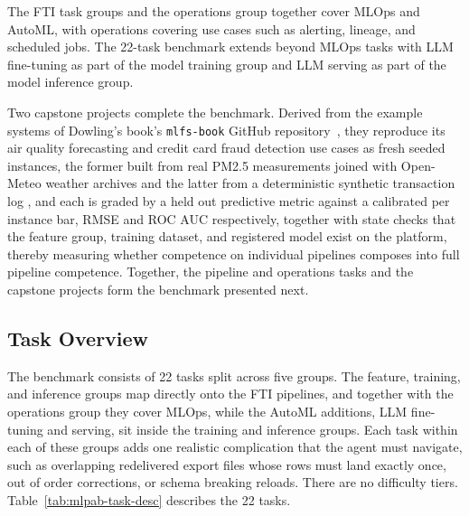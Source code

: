 \documentclass[
english,                 %
bibtex,                  %
]{kththesis}
\numberwithin{listing}{chapter}
\begin{document}
The \gls{FTI} task groups and the operations group together cover \gls{MLOps} and \gls{AutoML}, with operations covering use cases such as alerting, lineage, and scheduled jobs. The 22-task benchmark extends beyond \gls{MLOps} tasks with \gls{LLM} fine-tuning as part of the model training group and \gls{LLM} serving as part of the model inference group.

Two capstone projects complete the benchmark. Derived from the example systems of Dowling's book's \texttt{mlfs-book} GitHub repository~\cite{dowling_jimdowlingmlfs-book_2026}, they reproduce its air quality forecasting and credit card fraud detection use cases as fresh seeded instances, the former built from real \gls{PM2.5} measurements joined with Open-Meteo weather archives and the latter from a deterministic synthetic transaction log \cite{open-meteocom_free_2026}, and each is graded by a held out predictive metric against a calibrated per instance bar, \gls{RMSE} and \gls{ROC} \gls{AUC} respectively, together with state checks that the feature group, training dataset, and registered model exist on the platform, thereby measuring whether competence on individual pipelines composes into full pipeline competence. Together, the pipeline and operations tasks and the capstone projects form the benchmark presented next.

\subsection{Task Overview}
\label{sec:method_task_overview}
\glsresetall

The benchmark consists of 22 tasks split across five groups. The feature, training, and inference groups map directly onto the \gls{FTI} pipelines, and together with the operations group they cover \gls{MLOps}, while the \gls{AutoML} additions, \gls{LLM} fine-tuning and serving, sit inside the training and inference groups. Each task within each of these groups adds one realistic complication that the agent must navigate, such as overlapping redelivered export files whose rows must land exactly once, out of order corrections, or schema breaking reloads. There are no difficulty tiers. Table~\ref{tab:mlpab-task-desc} describes the 22 tasks.
\end{document}
